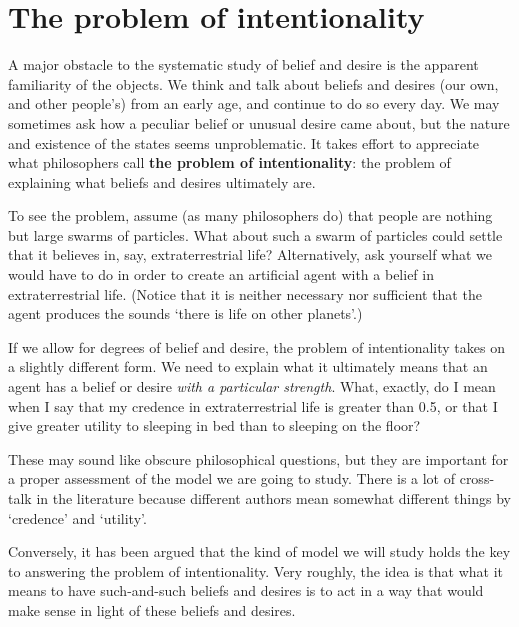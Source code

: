 \section{The problem of intentionality}

A major obstacle to the systematic study of belief and desire is the apparent
familiarity of the objects. We think and talk about beliefs and desires (our
own, and other people's) from an early age, and continue to do so every
day. We may sometimes ask how a peculiar belief or unusual desire came about,
but the nature and existence of the states seems unproblematic. It takes effort
to appreciate what philosophers call \textbf{the problem of intentionality}: the
problem of explaining what beliefs and desires ultimately are.

To see the problem, assume (as many philosophers do) that people are nothing but
large swarms of particles. What about such a swarm of particles could settle
that it believes in, say, extraterrestrial life? Alternatively, ask yourself
what we would have to do in order to create an artificial agent with a belief in
extraterrestrial life. (Notice that it is neither necessary nor sufficient that
the agent produces the sounds `there is life on other planets'.)

If we allow for degrees of belief and desire, the problem of intentionality
takes on a slightly different form. We need to explain what it ultimately means
that an agent has a belief or desire \emph{with a particular strength}. What,
exactly, do I mean when I say that my credence in extraterrestrial life is
greater than 0.5, or that I give greater utility to sleeping in bed than to
sleeping on the floor?

These may sound like obscure philosophical questions, but they are important for
a proper assessment of the model we are going to study. There is a lot of
cross-talk in the literature because different authors mean somewhat different
things by `credence' and `utility'.

Conversely, it has been argued that the kind of model we will study holds the
key to answering the problem of intentionality. Very roughly, the idea is that
what it means to have such-and-such beliefs and desires is to act in a
way that would make sense in light of these beliefs and desires.


